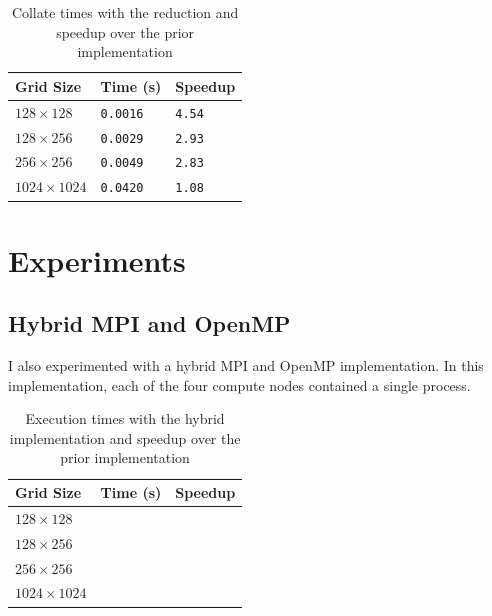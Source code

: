 \documentclass[twocolumn, a4paper]{article}
\begin{document}
\begin{table}[htbp]
  \begin{center}
  \caption{Collate times with the reduction and speedup over the prior implementation}\label{tab:reduction}
  \begin{tabular}[t]{l | l l} 
      \hline\hline
      Grid Size&Time (s)&Speedup\\
      \hline
      $128 \times 128$&\texttt{0.0016}&\texttt{4.54}\\
      $128 \times 256$&\texttt{0.0029}&\texttt{2.93}\\
      $256 \times 256$&\texttt{0.0049}&\texttt{2.83}\\
      $1024 \times 1024$&\texttt{0.0420}&\texttt{1.08}\\
      \hline
    \end{tabular}
  \end{center}
\end{table}

\section{Experiments}

\subsection{Hybrid MPI and OpenMP}

I also experimented with a hybrid MPI and OpenMP implementation.
In this implementation, each of the four compute nodes contained a single process.

\begin{table}[htbp]
  \begin{center}
  \caption{Execution times with the hybrid implementation and speedup over the prior implementation}\label{tab:hybrid}
  \begin{tabular}[t]{l | l l} 
      \hline\hline
      Grid Size&Time (s)&Speedup\\
      \hline
      $128 \times 128$&\texttt{}&\texttt{}\\
      $128 \times 256$&\texttt{}&\texttt{}\\
      $256 \times 256$&\texttt{}&\texttt{}\\
      $1024 \times 1024$&\texttt{}&\texttt{}\\
      \hline
    \end{tabular}
  \end{center}
\end{table}
\end{document}
